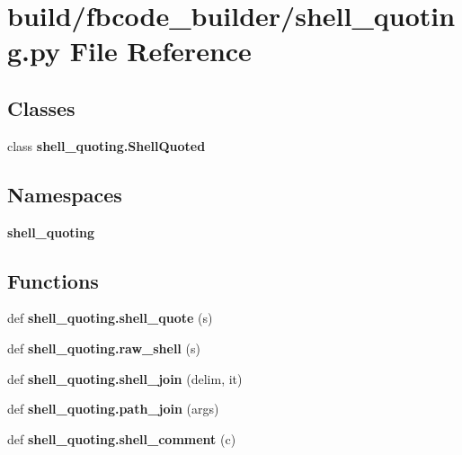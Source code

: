 \section{build/fbcode\+\_\+builder/shell\+\_\+quoting.py File Reference}
\label{shell__quoting_8py}
\subsection*{Classes}
\begin{DoxyCompactItemize}
\item 
class {\bf shell\+\_\+quoting.\+Shell\+Quoted}
\end{DoxyCompactItemize}
\subsection*{Namespaces}
\begin{DoxyCompactItemize}
\item 
 {\bf shell\+\_\+quoting}
\end{DoxyCompactItemize}
\subsection*{Functions}
\begin{DoxyCompactItemize}
\item 
def {\bf shell\+\_\+quoting.\+shell\+\_\+quote} (s)
\item 
def {\bf shell\+\_\+quoting.\+raw\+\_\+shell} (s)
\item 
def {\bf shell\+\_\+quoting.\+shell\+\_\+join} (delim, it)
\item 
def {\bf shell\+\_\+quoting.\+path\+\_\+join} (args)
\item 
def {\bf shell\+\_\+quoting.\+shell\+\_\+comment} (c)
\end{DoxyCompactItemize}
